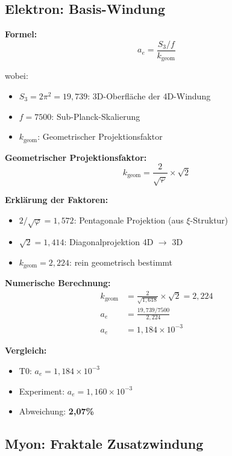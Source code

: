 	\subsection{Elektron: Basis-Windung}
	
	\textbf{Formel:}
	\begin{equation}
		a_e = \frac{S_3/f}{k_{\text{geom}}}
		\label{eq:ae}
	\end{equation}
	
	wobei:
	\begin{itemize}
		\item $S_3 = 2\pi^2 = 19{,}739$: 3D-Oberfläche der 4D-Windung
		\item $f = 7500$: Sub-Planck-Skalierung
		\item $k_{\text{geom}}$: Geometrischer Projektionsfaktor
	\end{itemize}
	
	\textbf{Geometrischer Projektionsfaktor:}
	\begin{equation}
		k_{\text{geom}} = \frac{2}{\sqrt{\varphi}} \times \sqrt{2}
		\label{eq:kgeom}
	\end{equation}
	
	\textbf{Erklärung der Faktoren:}
	\begin{itemize}
		\item $2/\sqrt{\varphi} = 1{,}572$: Pentagonale Projektion (aus $\xi$-Struktur)
		\item $\sqrt{2} = 1{,}414$: Diagonalprojektion 4D $\to$ 3D
		\item $k_{\text{geom}} = 2{,}224$: rein geometrisch bestimmt
	\end{itemize}
	
	\textbf{Numerische Berechnung:}
	\begin{align}
		k_{\text{geom}} &= \frac{2}{\sqrt{1{,}618}} \times \sqrt{2} = 2{,}224 \\
		a_e &= \frac{19{,}739 / 7500}{2{,}224} \\
		a_e &= 1{,}184 \times 10^{-3}
	\end{align}
	
	\textbf{Vergleich:}
	\begin{itemize}
		\item T0: $a_e = 1{,}184 \times 10^{-3}$
		\item Experiment: $a_e = 1{,}160 \times 10^{-3}$
		\item Abweichung: \textbf{2{,}07\%}
	\end{itemize}
	
	\subsection{Myon: Fraktale Zusatzwindung}
	
